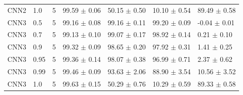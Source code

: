 \begin{table}[t]
\begin{tabular}{lllllll}
CNN2 & 1.0 & 5 & 99.59 $\pm$ 0.06 & 50.15 $\pm$ 0.50 & 10.10 $\pm$ 0.54 & 89.49 $\pm$ 0.58 \\
CNN3 & 0.5 & 5 & 99.16 $\pm$ 0.08 & 99.16 $\pm$ 0.11 & 99.20 $\pm$ 0.09 & -0.04 $\pm$ 0.01 \\
CNN3 & 0.7 & 5 & 99.13 $\pm$ 0.10 & 99.07 $\pm$ 0.17 & 98.92 $\pm$ 0.14 & 0.21 $\pm$ 0.10 \\
CNN3 & 0.9 & 5 & 99.32 $\pm$ 0.09 & 98.65 $\pm$ 0.20 & 97.92 $\pm$ 0.31 & 1.41 $\pm$ 0.25 \\
CNN3 & 0.95 & 5 & 99.36 $\pm$ 0.14 & 98.07 $\pm$ 0.38 & 96.99 $\pm$ 0.71 & 2.37 $\pm$ 0.62 \\
CNN3 & 0.99 & 5 & 99.46 $\pm$ 0.09 & 93.63 $\pm$ 2.06 & 88.90 $\pm$ 3.54 & 10.56 $\pm$ 3.52 \\
CNN3 & 1.0 & 5 & 99.63 $\pm$ 0.15 & 50.29 $\pm$ 0.76 & 10.29 $\pm$ 0.59 & 89.33 $\pm$ 0.58 \\
\bottomrule
\end{tabular}
\end{table}